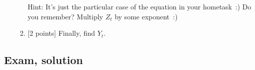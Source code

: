 \documentclass[12pt, a4paper]{article}
\begin{document}
\begin{enumerate}
\begin{enumerate}
    Hint: It's just the particular case of the equation in your hometask~:) Do you remember? Multiply $Z_t$ by some exponent~:)
    \item {[2 points]} Finally, find $Y_t$.
  \end{enumerate}

\end{enumerate}

\subsection{Exam, solution}
\end{document}
